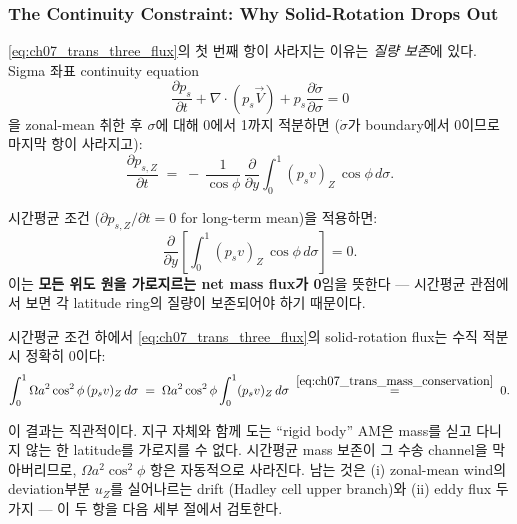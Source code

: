 \subsubsection{The Continuity Constraint: Why Solid-Rotation Drops Out}

\eqref{eq:ch07_trans_three_flux}의 첫 번째 항이 사라지는 이유는
\textit{질량 보존}에 있다.  Sigma 좌표 continuity equation
\begin{equation}\label{eq:ch07_trans_continuity_local}
  \frac{\partial p_s}{\partial t} + \nabla\!\cdot\!(p_s \vec{V})
  + p_s \frac{\partial \dot\sigma}{\partial \sigma} = 0
\end{equation}
을 zonal-mean 취한 후 $\sigma$에 대해 0에서 1까지 적분하면 ($\dot\sigma$가
boundary에서 0이므로 마지막 항이 사라지고):
\begin{equation}\label{eq:ch07_trans_continuity}
  \frac{\partial p_{s,Z}}{\partial t}
  \;=\;
  -\,\frac{1}{\cos\phi}\,\frac{\partial}{\partial y}
   \int_0^1 (p_s v)_Z\,\cos\phi\,d\sigma.
\end{equation}

시간평균 조건 ($\partial p_{s,Z}/\partial t = 0$ for long-term mean)을 적용하면:
\begin{equation}\label{eq:ch07_trans_mass_conservation}
   \frac{\partial}{\partial y}\!\left[
    \int_0^1 (p_s v)_Z\,\cos\phi\,d\sigma\right] = 0.
\end{equation}
이는 \textbf{모든 위도 원을 가로지르는 net mass flux가 0}임을 뜻한다 — 시간평균
관점에서 보면 각 latitude ring의 질량이 보존되어야 하기 때문이다.

\begin{theorem}\label{thm:ch07_trans_solid_zero}
시간평균 조건 하에서 \eqref{eq:ch07_trans_three_flux}의 solid-rotation flux는
수직 적분 시 정확히 0이다:
\begin{equation}\label{eq:ch07_trans_solid_zero}
  \int_0^1 \Omega a^2\cos^2\phi\,(p_s v)_Z\,d\sigma
  \;=\;
  \Omega a^2\cos^2\phi \int_0^1 (p_s v)_Z\,d\sigma
  \;\stackrel{\eqref{eq:ch07_trans_mass_conservation}}{=}\; 0.
\end{equation}
\end{theorem}


\begin{hisublock}
이 결과는 직관적이다.  지구 자체와 함께 도는 ``rigid body'' AM은 mass를
싣고 다니지 않는 한 latitude를 가로지를 수 없다.  시간평균 mass 보존이
그 수송 channel을 막아버리므로, $\Omega a^2\cos^2\phi$ 항은 자동적으로 사라진다.
남는 것은 (i) zonal-mean wind의 deviation부분 $u_Z$를 실어나르는 drift
(Hadley cell upper branch)와 (ii) eddy flux 두 가지 — 이 두 항을 다음
세부 절에서 검토한다.
\end{hisublock}

